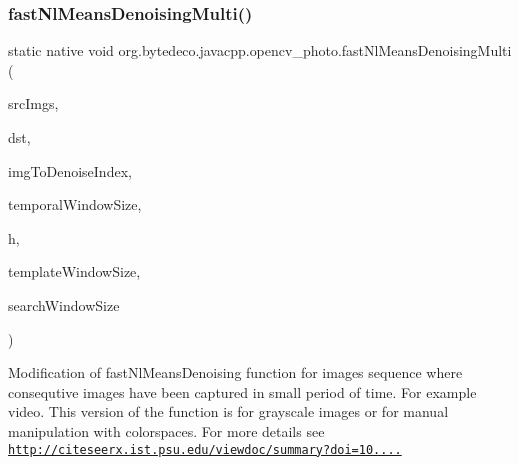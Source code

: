 \subsubsection{\texorpdfstring{fast\+Nl\+Means\+Denoising\+Multi()}{fastNlMeansDenoisingMulti()}\hspace{0.1cm}{\footnotesize\ttfamily [1/2]}}
{\footnotesize\ttfamily static native void org.\+bytedeco.\+javacpp.\+opencv\+\_\+photo.\+fast\+Nl\+Means\+Denoising\+Multi (\begin{DoxyParamCaption}\item[{@By\+Val Mat\+Vector}]{src\+Imgs,  }\item[{@By\+Val Mat}]{dst,  }\item[{int}]{img\+To\+Denoise\+Index,  }\item[{int}]{temporal\+Window\+Size,  }\item[{float}]{h,  }\item[{int}]{template\+Window\+Size,  }\item[{int}]{search\+Window\+Size }\end{DoxyParamCaption})\hspace{0.3cm}{\ttfamily [static]}}



Modification of fast\+Nl\+Means\+Denoising function for images sequence where consequtive images have been captured in small period of time. For example video. This version of the function is for grayscale images or for manual manipulation with colorspaces. For more details see \href{http://citeseerx.ist.psu.edu/viewdoc/summary?doi=10.1.1.131.6394}{\tt http\+://citeseerx.\+ist.\+psu.\+edu/viewdoc/summary?doi=10....} 



